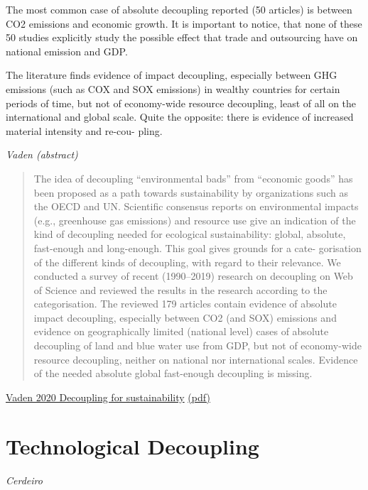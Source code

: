 \documentclass[
]{book}
\begin{document}
The most common case of absolute decoupling reported (50 articles)
is between CO2 emissions and economic growth. It is important to
notice, that none of these 50 studies explicitly study the possible effect
that trade and outsourcing have on national emission and GDP.

The literature finds evidence of impact decoupling, especially
between GHG emissions (such as COX and SOX emissions) in wealthy
countries for certain periods of time, but not of economy-wide resource
decoupling, least of all on the international and global scale. Quite the
opposite: there is evidence of increased material intensity and re-cou-
pling.

\emph{Vaden (abstract)}

\begin{quote}
The idea of decoupling ``environmental bads'' from ``economic goods'' has been proposed as a path towards
sustainability by organizations such as the OECD and UN. Scientific consensus reports on environmental impacts
(e.g., greenhouse gas emissions) and resource use give an indication of the kind of decoupling needed for
ecological sustainability: global, absolute, fast-enough and long-enough. This goal gives grounds for a cate-
gorisation of the different kinds of decoupling, with regard to their relevance. We conducted a survey of recent
(1990--2019) research on decoupling on Web of Science and reviewed the results in the research according to the
categorisation. The reviewed 179 articles contain evidence of absolute impact decoupling, especially between
CO2 (and SOX) emissions and evidence on geographically limited (national level) cases of absolute decoupling of
land and blue water use from GDP, but not of economy-wide resource decoupling, neither on national nor
international scales. Evidence of the needed absolute global fast-enough decoupling is missing.
\end{quote}

\href{https://www.sciencedirect.com/science/article/pii/S1462901120304342}{Vaden 2020 Decoupling for sustainability}
\href{/pdf/Vaden_2020_Decoupling_Review.pdf}{(pdf)}

\hypertarget{technological-decoupling}{%
\section{Technological Decoupling}\label{technological-decoupling}}

\emph{Cerdeiro}
\end{document}

